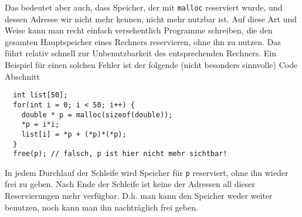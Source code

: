 Das bedeutet aber auch, dass Speicher, der mit \verb|malloc| reserviert wurde, und dessen Adresse wir nicht mehr kennen, nicht mehr nutzbar ist.
Auf diese Art und Weise kann man recht einfach versehentlich Programme schreiben, die den gesamten Hauptspeicher eines Rechners reservieren, ohne ihn zu nutzen.
Das führt relativ schnell zur Unbenutzbarkeit des entsprechenden Rechners.
Ein Beispiel für einen solchen Fehler ist der folgende (nicht besonders sinnvolle) Code Abschnitt
\begin{lstlisting}
  int list[50];
  for(int i = 0; i < 50; i++) {
    double * p = malloc(sizeof(double));
    *p = i*i;
    list[i] = *p + (*p)*(*p);
  }
  free(p); // falsch, p ist hier nicht mehr sichtbar!
\end{lstlisting}
In jedem Durchlauf der Schleife wird Speicher für \verb|p| reserviert, ohne ihn wieder frei zu geben.
Nach Ende der Schleife ist keine der Adressen all dieser Reservierungen mehr verfügbar.
D.h. man kann den Speicher weder weiter benutzen, noch kann man ihn nachträglich frei geben.

\endinput
